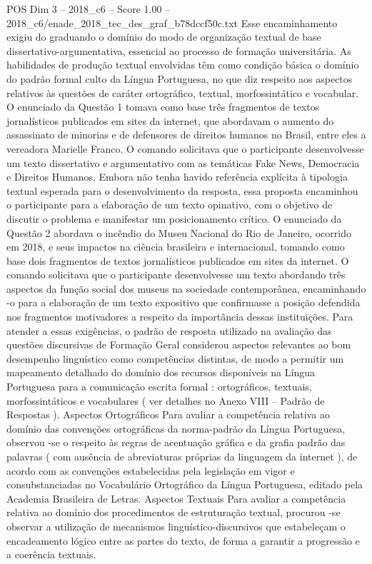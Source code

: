 \begin{textsample}{POS Dim 3 – 2018\_c6 – Score 1.00 – 2018\_c6/enade\_2018\_tec\_des\_graf\_b78dccf50c.txt}
Esse encaminhamento exigiu do graduando o domínio do modo de organização textual de base dissertativo-argumentativa, essencial ao processo de formação universitária.
As habilidades de produção textual envolvidas têm como condição básica o domínio do padrão formal culto da Língua Portuguesa, no que diz respeito aos aspectos relativos às questões de caráter ortográfico, textual, morfossintático e vocabular.
O enunciado da Questão 1 tomava como base três fragmentos de textos jornalísticos publicados em sites da internet, que abordavam o aumento do assassinato de minorias e de defensores de direitos humanos no Brasil, entre eles a vereadora Marielle Franco.
O comando solicitava que o participante desenvolvesse um texto dissertativo e argumentativo com as temáticas Fake News, Democracia e Direitos Humanos.
Embora não tenha havido referência explícita à tipologia textual esperada para o desenvolvimento da resposta, essa proposta encaminhou o participante para a elaboração de um texto opinativo, com o objetivo de discutir o problema e manifestar um posicionamento crítico.
O enunciado da Questão 2 abordava o incêndio do Museu Nacional do Rio de Janeiro, ocorrido em 2018, e seus impactos na ciência brasileira e internacional, tomando como base dois fragmentos de textos jornalísticos publicados em sites da internet.
O comando solicitava que o participante desenvolvesse um texto abordando três aspectos da função social dos museus na sociedade contemporânea, encaminhando -o para a elaboração de um texto expositivo que confirmasse a posição defendida nos fragmentos motivadores a respeito da importância dessas instituições.
Para atender a essas exigências, o padrão de resposta utilizado na avaliação das questões discursivas de Formação Geral considerou aspectos relevantes ao bom desempenho linguístico como competências distintas, de modo a permitir um mapeamento detalhado do domínio dos recursos disponíveis na Língua Portuguesa para a comunicação escrita formal : ortográficos, textuais, morfossintáticos e vocabulares ( ver detalhes no Anexo VIII – Padrão de Respostas ).
Aspectos Ortográficos Para avaliar a competência relativa ao domínio das convenções ortográficas da norma-padrão da Língua Portuguesa, observou -se o respeito às regras de acentuação gráfica e da grafia padrão das palavras ( com ausência de abreviaturas próprias da linguagem da internet ), de acordo com as convenções estabelecidas pela legislação em vigor e consubstanciadas no Vocabulário Ortográfico da Língua Portuguesa, editado pela Academia Brasileira de Letras.
Aspectos Textuais Para avaliar a competência relativa ao domínio dos procedimentos de estruturação textual, procurou -se observar a utilização de mecanismos linguístico-discursivos que estabeleçam o encadeamento lógico entre as partes do texto, de forma a garantir a progressão e a coerência textuais.

\end{textsample}
